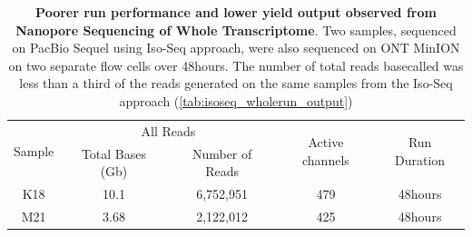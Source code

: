 \vspace{1cm}
\begin{table}[ht]
	\centering
	\begin{tabularx}{1\textwidth}{@{}ccccc@{}}
		\toprule
		\multirow{2}{*}{Sample} & \multicolumn{2}{c}{All Reads}      & \multirow{2}{*}{Active channels} & \multirow{2}{*}{Run Duration} \\ \cmidrule(lr){2-3}
		& Total Bases (Gb) & Number of Reads &                                  &                               \\ \midrule
		K18                     & 10.1             & 6,752,951       & 479                              & 48hours                       \\
		M21                     & 3.68             & 2,122,012       & 425                              & 48hours                       \\ \bottomrule
	\end{tabularx}
	\captionsetup{justification=raggedright,width=0.95\textwidth}
\caption[Run Yield Output from Whole Transcriptome Nanopore Sequencing of Tg4510]%
{\textbf{Poorer run performance and lower yield output observed from Nanopore Sequencing of Whole Transcriptome}. Two samples, sequenced on PacBio Sequel using Iso-Seq approach, were also sequenced on ONT MinION on two separate flow cells over 48hours. The number of total reads basecalled was less than a third of the reads generated on the same samples from the Iso-Seq approach (\cref{tab:isoseq_wholerun_output})}
\label{tab:ont_wholerun_output}
\end{table}

